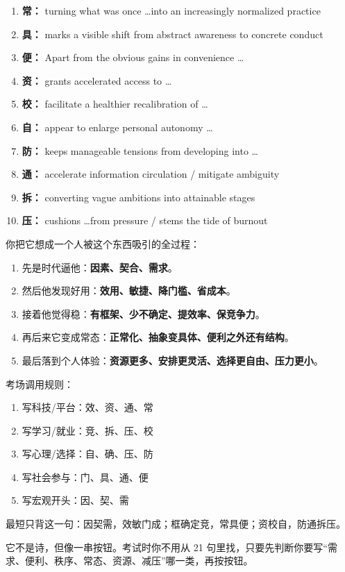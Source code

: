﻿\documentclass[lang=cn,11pt]{elegantbook}
\begin{document}
\begin{note}
\begin{enumerate}
  \item \textbf{常：} turning what was once \ldots into an increasingly normalized practice
  \item \textbf{具：} marks a visible shift from abstract awareness to concrete conduct
  \item \textbf{便：} Apart from the obvious gains in convenience \ldots

  \item \textbf{资：} grants accelerated access to \ldots
  \item \textbf{校：} facilitate a healthier recalibration of \ldots
  \item \textbf{自：} appear to enlarge personal autonomy \ldots

  \item \textbf{防：} keeps manageable tensions from developing into \ldots
  \item \textbf{通：} accelerate information circulation / mitigate ambiguity
  \item \textbf{拆：} converting vague ambitions into attainable stages
  \item \textbf{压：} cushions \ldots from pressure / stems the tide of burnout
\end{enumerate}

你把它想成一个人被这个东西吸引的全过程：

\begin{enumerate}
  \item 先是时代逼他：\textbf{因素、契合、需求}。
  \item 然后他发现好用：\textbf{效用、敏捷、降门槛、省成本}。
  \item 接着他觉得稳：\textbf{有框架、少不确定、提效率、保竞争力}。
  \item 再后来它变成常态：\textbf{正常化、抽象变具体、便利之外还有结构}。
  \item 最后落到个人体验：\textbf{资源更多、安排更灵活、选择更自由、压力更小}。
\end{enumerate}

考场调用规则：

\begin{enumerate}
  \item 写科技/平台：效、资、通、常
  \item 写学习/就业：竞、拆、压、校
  \item 写心理/选择：自、确、压、防
  \item 写社会参与：门、具、通、便
  \item 写宏观开头：因、契、需
\end{enumerate}

最短只背这一句：因契需，效敏门成；框确定竞，常具便；资校自，防通拆压。

它不是诗，但像一串按钮。考试时你不用从 21 句里找，只要先判断你要写“需求、便利、秩序、常态、资源、减压”哪一类，再按按钮。
\end{note}
\end{document}
